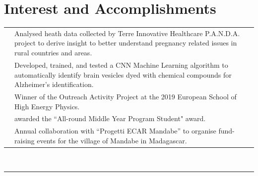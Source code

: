 \documentclass[oneside]{article}
\begin{document}
{\begin{minipage}[t][\dimexpr\textheight-2\fboxrule-2\fboxsep\relax][t]{\dimexpr0.4\textwidth-2\fboxrule-2\fboxsep\relax}
        \section*{\large Interest and Accomplishments}
        \begin{tabularx}{\textwidth}{cY}
             & Analysed heath data collected by Terre Innovative Healthcare P.A.N.D.A. project to derive insight to better understand pregnancy related issues in rural countries and areas.\\
             & Developed, trained, and tested a CNN Machine Learning algorithm to automatically identify brain vesicles dyed with chemical compounds for Alzheimer's identification. \\
             & Winner of the Outreach Activity Project at the 2019 European School of High Energy Physics.\\
             & awarded the “All-round Middle Year Program Student" award.\\
             & Annual collaboration with “Progetti ECAR Mandabe” to organise fund-raising events for the village of Mandabe in Madagascar.\\
        \end{tabularx}
        \vspace{.3cm}
        \\
        \rule{\linewidth}{0.4pt}
    \end{minipage}%
}%
\end{document}
